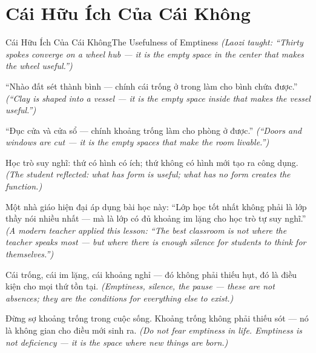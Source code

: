 \section{Cái Hữu Ích Của Cái Không}
\begin{truyen}{Cái Hữu Ích Của Cái Không}{The Usefulness of Emptiness}
\textit{(Laozi taught: ``Thirty spokes converge on a wheel hub — it is the empty space in the center that makes the wheel useful.'')}

``Nhào đất sét thành bình — chính cái trống ở trong làm cho bình chứa được.''
\textit{(``Clay is shaped into a vessel — it is the empty space inside that makes the vessel useful.'')}

``Đục cửa và cửa sổ — chính khoảng trống làm cho phòng ở được.''
\textit{(``Doors and windows are cut — it is the empty spaces that make the room livable.'')}

Học trò suy nghĩ: thứ có hình có ích; thứ không có hình mới tạo ra công dụng.
\textit{(The student reflected: what has form is useful; what has no form creates the function.)}

Một nhà giáo hiện đại áp dụng bài học này: ``Lớp học tốt nhất không phải là lớp thầy nói nhiều nhất — mà là lớp có đủ khoảng im lặng cho học trò tự suy nghĩ.''
\textit{(A modern teacher applied this lesson: ``The best classroom is not where the teacher speaks most — but where there is enough silence for students to think for themselves.'')}

Cái trống, cái im lặng, cái khoảng nghỉ — đó không phải thiếu hụt, đó là điều kiện cho mọi thứ tồn tại.
\textit{(Emptiness, silence, the pause — these are not absences; they are the conditions for everything else to exist.)}

\end{truyen}

\begin{baihoc}
Đừng sợ khoảng trống trong cuộc sống. Khoảng trống không phải thiếu sót — nó là không gian cho điều mới sinh ra.
\textit{(Do not fear emptiness in life. Emptiness is not deficiency — it is the space where new things are born.)}
\end{baihoc}
\ngancach

